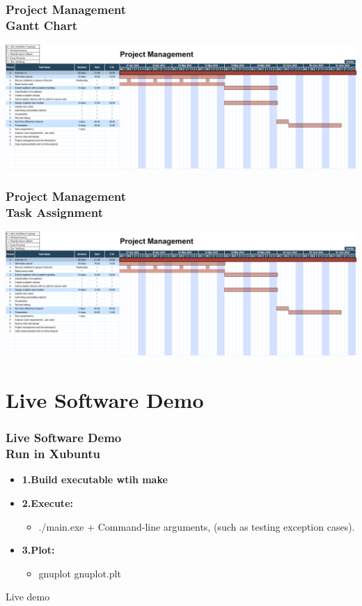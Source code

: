 \documentclass[ucs,10pt]{beamer}
\begin{document}
\begin{frame}
\frametitle{Project Management \\
	\small \color{rwth-blue} Gantt Chart}
	
	\begin{center}
		\includegraphics[width=\textwidth]{figures/project management.png}
	\end{center}
\end{frame}

\begin{frame}
\frametitle{Project Management \\
	\small \color{rwth-blue} Task Assignment}
	
	\begin{flushleft}
		\includegraphics[height=\textheight,keepaspectratio]{figures/project management.png}
	\end{flushleft}
\end{frame}
	
\section{Live Software Demo}

\begin{frame}
\frametitle{Live Software Demo \\
	\small \color{rwth-blue} Run in Xubuntu}
	\begin{itemize}	
			\item \textbf{1.Build executable wtih make}
			\item \textbf{2.Execute:}
				\begin{itemize}
				\item ./main.exe + Command-line arguments, (such as testing exception cases).
				\end{itemize}
			\item \textbf{3.Plot:}
				\begin{itemize}
				\item gnuplot gnuplot.plt
				\end{itemize}
	\end{itemize}
	\begin{center}
		\large Live demo
	\end{center}
\end{frame}
\end{document}
